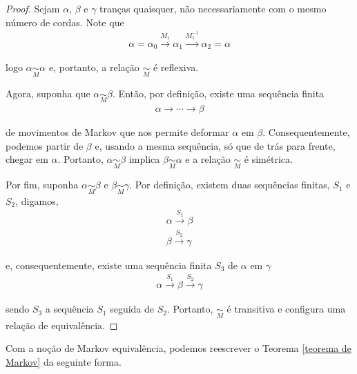 	\begin{proof}
		Sejam $\alpha$, $\beta$ e $\gamma$ tranças quaisquer, não necessariamente com o mesmo número de cordas. Note que 
		\begin{align*}
		\alpha = \alpha_0\overset{M_1}{\to}\alpha_1\overset{M_1^{-1}}{\to}\alpha_2 = \alpha
		\end{align*}
		\par\vspace{0.3cm} logo $\alpha\underset{M}{\sim}\alpha$ e, portanto, a relação $\underset{M}{\sim}$ é reflexiva.
		\par\vspace{0.3cm} Agora, suponha que $\alpha\underset{M}{\sim}\beta$. Então, por definição, existe uma sequência finita
		\begin{align*}
		\alpha\to\cdots\to\beta 
		\end{align*}
		\par\vspace{0.3cm} de movimentos de Markov que nos permite deformar $\alpha$ em $\beta$. Consequentemente, podemos partir de $\beta$ e, usando a mesma sequência, só que de trás para frente, chegar em $\alpha$. Portanto, $\alpha\underset{M}{\sim}\beta$ implica $\beta\underset{M}{\sim}\alpha$ e a relação $\underset{M}{\sim}$ é simétrica.
		\par\vspace{0.3cm} Por fim, suponha $\alpha\underset{M}{\sim}\beta$ e $\beta\underset{M}{\sim}\gamma$. Por definição, existem duas sequências finitas, $S_1$ e $S_2$, digamos, 
		\begin{align*}
		\alpha\overset{S_1}{\to}\beta \\
		\beta\overset{S_2}{\to}\gamma 	
		\end{align*}
		\par\vspace{0.3cm} e, consequentemente, existe uma sequência finita $S_3$ de $\alpha$ em $\gamma$
		\begin{align*}
		\alpha\overset{S_1}{\to}\beta\overset{S_2}{\to}\gamma 
		\end{align*}
		\par\vspace{0.3cm} sendo $S_3$ a sequência $S_1$ seguida de $S_2$. Portanto, $\underset{M}{\sim}$ é transitiva e configura uma relação de equivalência.
	\end{proof}
	\par\vspace{0.3cm} Com a noção de Markov equivalência, podemos reescrever o Teorema \eqref{teorema de Markov} da seguinte forma.
